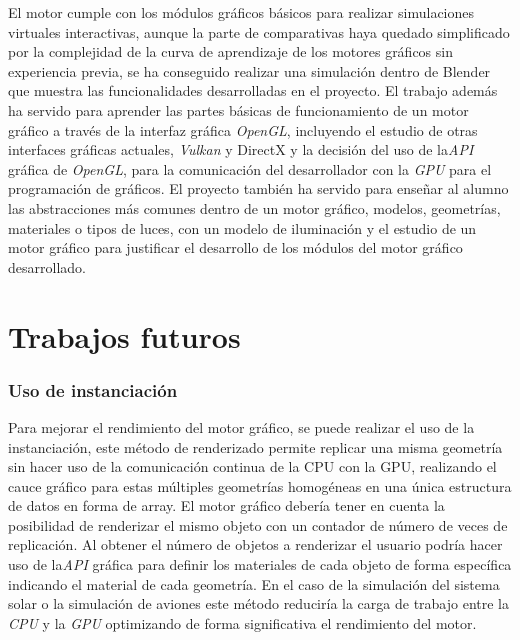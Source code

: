 \documentclass[a4paper]{book}
\begin{document}
El motor cumple con los módulos gráficos básicos para realizar simulaciones virtuales interactivas, aunque la parte de comparativas haya
quedado simplificado por la complejidad de la curva de aprendizaje de los motores gráficos sin experiencia previa, se ha conseguido realizar
una simulación dentro de Blender que muestra las funcionalidades desarrolladas en el proyecto. El trabajo además ha servido para aprender
las partes básicas de funcionamiento de un motor gráfico a través de la interfaz gráfica \textit{OpenGL}, incluyendo el estudio de otras interfaces
gráficas actuales, \textit{Vulkan} y DirectX y la decisión del uso de la\textit{API} gráfica de \textit{OpenGL},
para la comunicación del desarrollador con la \textit{GPU} para el programación de gráficos. El proyecto también ha servido para
enseñar al alumno las abstracciones más comunes dentro de un motor gráfico, modelos, geometrías, materiales o tipos de luces, con un
modelo de iluminación y el estudio de un motor gráfico para justificar el desarrollo de los módulos del motor gráfico desarrollado.

\section{Trabajos futuros}
\label{sec:trabajos_futuros}

\subsubsection{Uso de instanciación}

Para mejorar el rendimiento del motor gráfico, se puede realizar el uso de la instanciación, este método de renderizado
permite replicar una misma geometría sin hacer uso de la comunicación continua de la CPU con la GPU, realizando el cauce
gráfico para estas múltiples geometrías homogéneas en una única estructura de datos en forma de array. El motor gráfico
debería tener en cuenta la posibilidad de renderizar el mismo objeto con un contador de número de veces de replicación.
Al obtener el número de objetos a renderizar el usuario podría hacer uso de la\textit{API} gráfica para definir los materiales
de cada objeto de forma específica indicando el material de cada geometría. En el caso de la simulación del sistema solar o la
simulación de aviones este método reduciría la carga de trabajo entre la \textit{CPU} y la \textit{GPU} optimizando de forma
significativa el rendimiento del motor.
\end{document}
